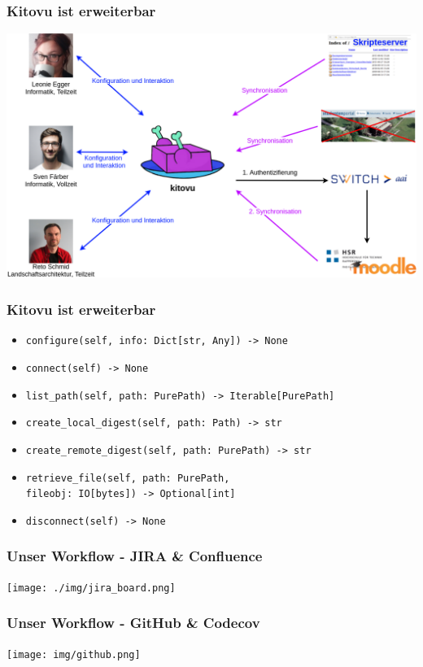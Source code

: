 \documentclass{beamer}
\newcommand{\py}[1]{\texttt{#1}}
\begin{document}
	\begin{frame}
	\frametitle{Kitovu ist erweiterbar}
	\includegraphics[width=\linewidth]{../03_End_of_Elaboration/img/kontextdiagramm.png}
	\end{frame}
	
	\begin{frame}[fragile]
	\frametitle{Kitovu ist erweiterbar}

  \begin{itemize}
    \item \py{configure(self, info: Dict[str, Any]) -> None}
    \item \py{connect(self) -> None}
    \item \py{list_path(self, path: PurePath) -> Iterable[PurePath]}
    \item \py{create_local_digest(self, path: Path) -> str}
    \item \py{create_remote_digest(self, path: PurePath) -> str}
    \item \py{retrieve_file(self, path: PurePath,} \\ \hspace{7em} \py{fileobj: IO[bytes]) -> Optional[int]}
    \item \py{disconnect(self) -> None}
  \end{itemize}
\end{frame}

  \begin{frame}
    \frametitle{Unser Workflow - JIRA \& Confluence}
    \texttt{[image: ./img/jira\_board.png]}
  \end{frame}

	\begin{frame}
	\frametitle{Unser Workflow - GitHub \& Codecov}
  \begin{center}
	\texttt{[image: img/github.png]}
  \end{center}
	\end{frame}
\end{document}
